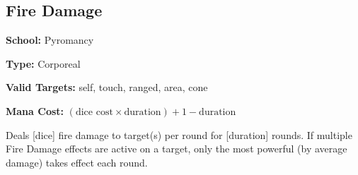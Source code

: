 \subsection{Fire Damage}

\noindent
\textbf{School:} Pyromancy

\noindent
\textbf{Type:} Corporeal

\noindent
\textbf{Valid Targets:} self, touch, ranged, area, cone

\noindent
\textbf{Mana Cost:} $(\text{dice cost} \times \text{duration}) + \text{1} - \text{duration}$

Deals [dice] fire damage to target(s) per round for [duration] rounds. If
multiple Fire Damage effects are active on a target, only the most powerful (by
average damage) takes effect each round.
